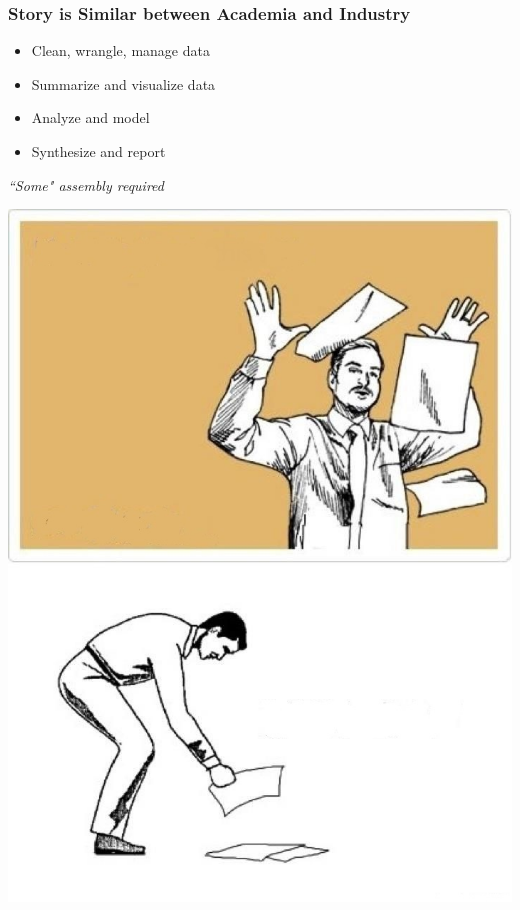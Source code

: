 \documentclass[xcolor={dvipsnames}]{beamer}
\newcommand{\bi}{\begin{itemize}}
\newcommand{\ei}{\end{itemize}}
\begin{document}
\begin{frame}
\frametitle{Story is Similar between Academia and Industry}
\begin{minipage}{.45\textwidth}
\bi
	\item Clean, wrangle, manage data
	\item Summarize and visualize data
	\item Analyze and model
	\item Synthesize and report
\ei
\begin{center}
	\emph{``Some" assembly required}
\end{center}
\end{minipage}
\begin{minipage}{.45\textwidth}
\begin{center}
	\includegraphics[width = \textwidth]{flyingpapers.jpg}
\end{center}
\end{minipage}
\end{frame}
\end{document}
